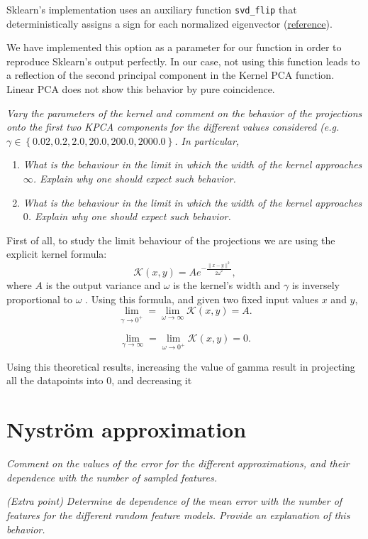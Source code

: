 \documentclass[11pt]{article}
\begin{document}
Sklearn's implementation uses an auxiliary function \texttt{svd\_flip} that deterministically assigns a sign for each normalized eigenvector (\href{https://github.com/scikit-learn/scikit-learn/blob/15c2c72e27c6ea18566f4e786506c7a3aef8a5de/sklearn/utils/extmath.py#L504}{reference}).

We have implemented this option as a parameter for our function in order to reproduce Sklearn's output perfectly. In our case, not using this function leads to a reflection of the second principal component in the Kernel PCA function. Linear PCA does not show this behavior by pure coincidence.

\emph{Vary the parameters of the kernel and comment on the behavior of the projections onto the first two KPCA components for the different values considered (e.g. $\gamma \in \left\{0.02, 0.2, 2.0, 20.0, 200.0, 2000.0\right\}$. In particular,}
\begin{enumerate}
    \item \emph{What is the behaviour in the limit in which the width of the kernel approaches $\infty$. Explain why one should expect such behavior.}
    \item \emph{What is the behaviour in the limit in which the width of the kernel approaches $0$. Explain why one should expect such behavior.}
\end{enumerate}

First of all, to study the limit behaviour of the projections we are using the explicit kernel formula:
\[
     \mathcal{K}(x, y) = Ae^{-\frac{\|x-y\|^{2}}{2 \omega^2}},
\]
where \( A \) is the output variance and \( \omega \) is the kernel's width and \( \gamma \) is inversely proportional to \( \omega \) . Using this formula, and given two fixed input values \( x \) and \( y \),
\[
     \lim_{\gamma \to 0^{+}} = \lim_{\omega \to \infty} \mathcal{K}(x,y) = A.
\]

\[
     \lim_{\gamma \to \infty} = \lim_{\omega \to 0^{+}} \mathcal{K}(x,y) = 0.
\]

Using this theoretical results, increasing the value of gamma result in projecting all the datapoints into \( 0 \), and decreasing it

\section*{Nyström approximation}

\emph{Comment on the values of the error for the different approximations, and their dependence with the number of sampled features.}

\emph{(Extra point) Determine de dependence of the mean error with the number of features for the different random feature models. Provide an explanation of this behavior.}
\end{document}
